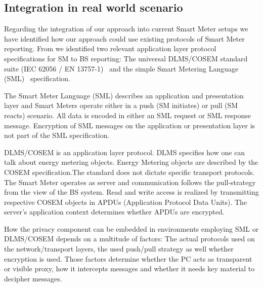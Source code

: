 \documentclass[english]{llncs}
\begin{document}
\subsection{Integration in real world scenario}\label{realworld}
Regarding the integration of our approach into current Smart Meter setups we have identified how our approach could use existing protocols of Smart Meter reporting. 
From \cite{smartmeterstandardcomparison} we identified two relevant application layer protocol specifications for SM to BS reporting: The universal DLMS/COSEM standard suite (IEC 62056 / EN 13757-1)~\cite{dlmscosem} and the simple Smart Metering Language~ (SML)~\cite{sml} specification. 

The Smart Meter Language (SML) describes an application and presentation layer and Smart Meters operate either in a push (SM initiates) or pull (SM reacts) scenario. 
All data is encoded in either an SML request or SML response message. Encryption of SML messages on the application or presentation layer is not part of the SML specification.


DLMS/COSEM is an application layer protocol. DLMS specifies how one can talk about energy metering objects. Energy Metering objects are described by the COSEM specification.The standard does not dictate specific transport protocols. The Smart Meter operates as server and communication follows the pull-strategy from the view of the BS system. Read and write access is realized by transmitting respective COSEM objects in APDUs (Application Protocol Data Units). The server's application context determines whether APDUs are encrypted.


How the privacy component can be embedded in environments employing SML or DLMS/COSEM depends on a multitude of factors: The actual protocols used on the network/transport layers, the used push/pull strategy as well whether encryption is used. Those factors determine whether the PC acts as transparent or visible proxy, how it intercepts messages and whether it needs key material to decipher messages.
\end{document}
